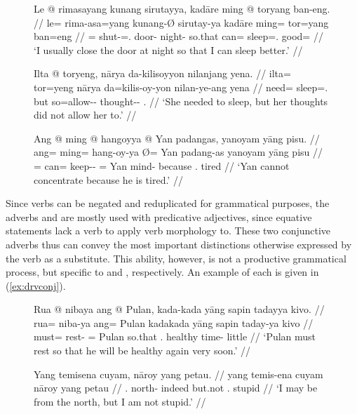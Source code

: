 \begin{figure}[h]
\pex\label{ex:conjadvs}
\a\begingl[glspace=.25em]
	\gla Le @ rimasayang kunang sirutayya, kadāre ming @ toryang ban-eng. //
	\glb le= rima-asa=yang kunang-Ø sirutay-ya kadāre ming= tor=yang 
		ban=eng //
	\glc \PatTI{}= shut-\Hab{}=\Fsg{}.\Aarg{} door-\Top{} night-\Loc{} 
		so.that can= sleep=\Fsg{}.\Aarg{} good=\Comp{} //
	\glft `I usually close the door at night so that I can sleep better.' //
\endgl

\a\label{ex:but}\begingl
	\gla Ilta @ toryeng, nārya da-kilisoyyon nilanjang yena. //
	\glb ilta= tor=yeng nārya da=kilis-oy-yon nilan-ye-ang yena //
	\glc need= sleep=\TsgF{}.\Aarg{} but so=allow-\Neg{}-\TplN{} 
		thought-\Pl{}-\Aarg{} \TsgF{}.\Gen{} //
	\glft `She needed to sleep, but her thoughts did not allow her to.' //
\endgl

\a\begingl
	\gla Ang @ ming @ hangoyya {} @ Yan padangas, yanoyam yāng pisu. //
	\glb ang= ming= hang-oy-ya Ø= Yan padang-as yanoyam yāng pisu //
	\glc \AgtT{}= can= keep-\Neg{}-\TsgM{} \Top{}= Yan mind-\Parg{} because 
		\TsgM{}.\Aarg{} tired //
	\glft `Yan cannot concentrate because he is tired.' //
\endgl
\xe
\end{figure}

Since verbs can be negated and reduplicated for grammatical purposes, the
adverbs  and  are mostly used with predicative adjectives, since equative statements
lack a verb to apply verb morphology to. These two conjunctive adverbs thus can
convey the most important distinctions otherwise expressed by the verb as a
substitute. This ability, however, is not a productive grammatical process, but
specific to  and , respectively. An
example of each is given in (\ref{ex:drvconj}).

\begin{figure}[h]
\pex\label{ex:drvconj}
\a\label{ex:sothatagain}\begingl
	\gla Rua @ nibaya ang @ Pulan, kada-kada yāng sapin tadayya kivo. //
	\glb rua= niba-ya ang= Pulan kada\til{}kada yāng sapin taday-ya kivo //
	\glc must= rest-\TsgM{} \Aarg{}= Pulan \Iter{}\til{}so.that 
		\TsgM{}.\Aarg{} healthy time-\Loc{} little //
	\glft `Pulan must rest so that he will be healthy again very soon.' //
\endgl

\a\label{ex:butnot}\begingl
	\gla Yang temisena cuyam, nāroy yang petau. //
	\glb yang temis-ena cuyam nāroy yang petau //
	\glc \Fsg{}.\Aarg{} north-\Gen{} indeed but.not \Fsg{}.\Aarg{} stupid //
	\glft `I may be from the north, but I am not stupid.' //
\endgl
\xe
\end{figure}

